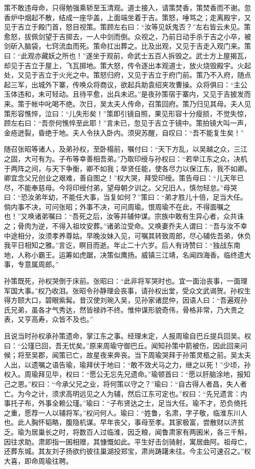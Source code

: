 策不敢违母命，只得勉强乘轿至玉清观。道士接入，请策焚香，策焚香而不谢。忽香炉中烟起不散，结成一座华盖，上面端坐着于吉。策怒，唾骂之；走离殿宇，又见于吉立于殿门首，怒目视策。策顾左右曰：“汝等见妖鬼否？”左右皆云未见。策愈怒，拔佩剑望于吉掷去，一人中剑而倒。众视之，乃前日动手杀于吉之小卒，被剑斫入脑袋，七窍流血而死。策命扛出葬之。比及出观，又见于吉走入观门来。策曰：“此观亦藏妖之所也！”遂坐于观前，命武士五百人拆毁之。武士方上屋揭瓦，却见于吉立于屋上，飞瓦掷地。策大怒，传令逐出本观道士，放火烧毁殿宇。火起处，又见于吉立于火光之中。策怒归府，又见于吉立于府门前。策乃不入府，随点起三军，出城外下寨，传唤众将商议，欲起兵助袁绍夹攻曹操。众将俱曰：“主公玉体违和，未可轻动。且待平愈，出兵未迟。”是夜孙策宿于寨内，又见于吉披发而来。策于帐中叱喝不绝。次日，吴太夫人传命，召策回府。策乃归见其母。夫人见策形容憔悴，泣曰：“儿失形矣！”策即引镜自照，果见形容十分瘦损，不觉失惊，顾左右曰：“吾奈何憔悴至此耶！”言未已，忽见于吉立于镜中。策拍镜大叫一声，金疮迸裂，昏绝于地。夫人令扶入卧内。须臾苏醒，自叹曰：“吾不能复生矣！”

随召张昭等诸人，及弟孙权，至卧榻前，嘱付曰：“天下方乱，以吴越之众，三江之固，大可有为。子布等幸善相吾弟。”乃取印绶与孙权曰：“若举江东之众，决机于两阵之间，与天下争衡，卿不如我；举贤任能，使各尽力以保江东，我不如卿。卿宜念父兄创业之艰难，善自图之！”权大哭，拜受印绶。策告母曰：“儿天年已尽，不能奉慈母。今将印绶付弟，望母朝夕训之。父兄旧人，慎勿轻怠。”母哭曰：“恐汝弟年幼，不能任大事，当复如何？”策曰：“弟才胜儿十倍，足当大任。倘内事不决，可问张昭；外事不决，可问周瑜。恨周瑜不在此，不得面嘱之也！”又唤诸弟嘱曰：“吾死之后，汝等并辅仲谋。宗族中敢有生异心者，众共诛之；骨肉为逆，不得入祖坟安葬。”诸弟泣受命。又唤妻乔夫人谓曰：“吾与汝不幸中途相分，汝须孝养尊姑。早晚汝妹入见，可嘱其转致周郎，尽心辅佐吾弟，休负我平日相知之雅。”言讫，瞑目而逝。年止二十六岁。后人有诗赞曰：“独战东南地，人称小霸王。运筹如虎踞，决策似鹰扬。威镇三江靖，名闻四海香。临终遗大事，专意属周郎。”

孙策既死，孙权哭倒于床前。张昭曰：“此非将军哭时也。宜一面治丧事，一面理军国大事。”权乃收泪。张昭令孙静理会丧事，请孙权出堂，受众文武谒贺。孙权生得方颐大口，碧眼紫髯。昔汉使刘琬入吴，见孙家诸昆仲，因语人曰：“吾遍观孙氏兄弟，虽各才气秀达，然皆禄祚不终。惟仲谋形貌奇伟，骨格非常，乃大贵之表，又亨高寿，众皆不及也。”

且说当时孙权承孙策遗命，掌江东之事。经理未定，人报周瑜自巴丘提兵回吴。权曰：“公瑾已回，吾无忧矣。”原来周瑜守御巴丘。闻知孙策中箭被伤，因此回来问候；将至吴郡，闻策已亡，故星夜来奔丧。当下周瑜哭拜于孙策灵柩之前。吴太夫人出，以遗嘱之语告瑜，瑜拜伏于地曰：“敢不效犬马之力，继之以死！”少顷，孙权入。周瑜拜见毕，权曰：“愿公无忘先兄遗命。”瑜顿首曰：“愿以肝脑涂地，报知己之恩。”权曰：“今承父兄之业，将何策以守之？”瑜曰：“自古得人者昌，失人者亡。为今之计，须求高明远见之人为辅，然后江东可定也。”权曰：“先兄遗言：内事托子布，外事全赖公瑾。”瑜曰：“子布贤达之士，足当大任。瑜不才，恐负倚托之重，愿荐一人以辅将军。”权问何人。瑜曰：“姓鲁，名肃，字子敬，临淮东川人也。此人胸怀韬略，腹隐机谋。早年丧父，事母至孝。其家极富，尝散财以济贫乏。瑜为居巢长之时，将数百人过临淮，因乏粮，闻鲁肃家有两囷米，各三千斛，因往求助。肃即指一囷相赠，其慷慨如此。平生好击剑骑射，寓居曲阿。祖母亡，还葬东城。其友刘子扬欲约彼往巢湖投郑宝，肃尚踌躇未往。今主公可速召之。”权大喜，即命周瑜往聘。

